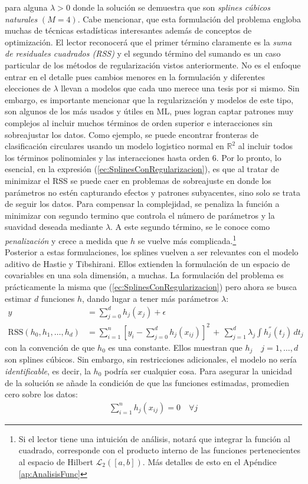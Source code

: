 \documentclass[../Main/Main.tex]{subfiles}
\begin{document}
para alguna $\lambda > 0$ donde la solución se demuestra que son \textit{splines cúbicos naturales} $(M = 4)$. Cabe mencionar, que esta formulación del problema engloba muchas de técnicas estadísticas interesantes además de conceptos de optimización. El lector reconocerá que el primer término claramente es la \textit{suma de residuales cuadrados (RSS)} y el segundo término del sumando es un caso particular de los métodos de regularización vistos anteriormente. No es el enfoque entrar en el detalle pues cambios menores en la formulación y diferentes elecciones de $\lambda$ llevan a modelos que cada uno merece una tesis por si mismo. Sin embargo, es importante mencionar que la regularización y modelos de este tipo, son algunos de los más usados y útiles en ML, pues logran captar patrones muy complejos al incluir muchos términos de orden superior e interacciones sin sobreajustar los datos. Como ejemplo, se puede encontrar fronteras de clasificación circulares usando un modelo logistico normal en $\mathbb{R}^2$ al incluir todos los términos polinomiales y las interacciones hasta orden 6. Por lo pronto, lo esencial, en la expresión (\ref{ec:SplinesConRegularizacion}), es que al tratar de minimizar el RSS se puede caer en problemas de sobreajuste en donde los parámetros no estén capturando efectos y patrones subyacentes, sino solo se trata de seguir los datos. Para compensar la complejidad, se penaliza la función a minimizar con segundo termino que controla el número de parámetros y la suavidad deseada mediante $\lambda$. A este segundo término, se le conoce como \textit{penalización} y crece a medida que $h$ se vuelve más complicada.\footnote{Si el lector tiene una intuición de análisis, notará que integrar la función al cuadrado, corresponde con el producto interno de las funciones pertenecientes al espacio de Hilbert $\mathcal{L}_2([a,b])$. Más detalles de esto en el  Apéndice \ref{ap:AnalisisFunc}}\\

Posterior a estas formulaciones, los splines vuelven a ser relevantes con el modelo aditivo de Hastie y Tibshirani. Ellos extienden la formulación de un espacio de covariables en una sola dimensión, a muchas. La formulación del problema es prácticamente la misma que  (\ref{ec:SplinesConRegularizacion}) pero ahora se busca estimar $d$ funciones $h$, dando lugar a tener más parámetros $\lambda$:
\begin{align*}
	y &= \sum_{j = 0}^d h_j(x_j) + \epsilon \\	
	\text{RSS}(h_0, h_1, \ldots, h_d) &= \sum_{i = 1}^n[y_i - \sum_{j = 0}^d h_j(x_{ij})]^2 \, + \, \sum_{j = 1}^d\lambda_j 			\int h_j^{''}(t_j) \, dt_j
\end{align*}
con la convención de que $h_0$ es una constante. Ellos muestran que $h_j \quad j = 1,\ldots,d$ son splines cúbicos. Sin embargo, sin restricciones adicionales, el modelo no sería \textit{identificable}, es decir, la $h_0$ podría ser cualquier cosa. Para asegurar la unicidad de la solución se añade la condición de que las funciones estimadas, promedien cero sobre los datos:
\begin{align}
	\sum_{i = 1}^n h_j(x_{ij}) = 0 \quad \forall j \label{ec:RestriccionGAM}
\end{align}
\end{document}
